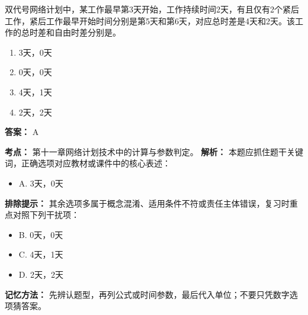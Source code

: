 \documentclass[UTF8,fontset=fandol,11pt]{ctexart}
\begin{document}
\begin{quizbox}[title={第 4 题}]
双代号网络计划中，某工作最早第3天开始，工作持续时间2天，有且仅有2个紧后工作，紧后工作最早开始时间分别是第5天和第6天，对应总时差是4天和2天。该工作的总时差和自由时差分别是。\\
\begin{enumerate}[label=\Alph*.]
\item 3天，0天
\item 0天，0天
\item 4天，1天
\item 2天，2天
\end{enumerate}
\textbf{答案：} A
\vspace{0.25em}
\begin{answerbox}[title={考点解析}]
\textbf{考点：} 第十一章网络计划技术中的计算与参数判定。
\textbf{解析：} 本题应抓住题干关键词，正确选项对应教材或课件中的核心表述：
\begin{itemize}
\item A. 3天，0天
\end{itemize}
\textbf{排除提示：} 其余选项多属于概念混淆、适用条件不符或责任主体错误，复习时重点对照下列干扰项：
\begin{itemize}
\item B. 0天，0天
\item C. 4天，1天
\item D. 2天，2天
\end{itemize}
\textbf{记忆方法：} 先辨认题型，再列公式或时间参数，最后代入单位；不要只凭数字选项猜答案。
\end{answerbox}
\end{quizbox}
\end{document}
